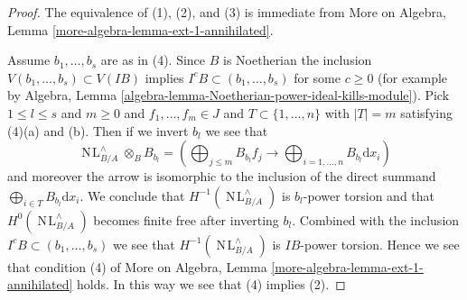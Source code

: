 \documentclass{stacks-project}
\theoremstyle{plain}
\theoremstyle{definition}
\theoremstyle{remark}
\numberwithin{equation}{subsection}
\def\NL{\mathop{N\!L}\nolimits}
\begin{document}
\begin{proof}
The equivalence of (1), (2), and (3) is immediate from
More on Algebra, Lemma \ref{more-algebra-lemma-ext-1-annihilated}.

\medskip\noindent
Assume $b_1, \ldots, b_s$ are as in (4). Since $B$ is Noetherian the inclusion
$V(b_1, \ldots, b_s) \subset V(IB)$ implies $I^cB \subset (b_1, \ldots, b_s)$
for some $c \geq 0$ (for example by
Algebra, Lemma \ref{algebra-lemma-Noetherian-power-ideal-kills-module}).
Pick $1 \leq l \leq s$ and $m \geq 0$ and $f_1, \ldots, f_m \in J$
and $T \subset \{1, \ldots, n\}$ with $|T| = m$ satisfying (4)(a) and (b).
Then if we invert $b_l$ we see that
$$
\NL_{B/A}^\wedge \otimes_B B_{b_l} =
\left(
\bigoplus\nolimits_{j \leq m} B_{b_l} f_j
\longrightarrow
\bigoplus\nolimits_{i = 1, \ldots, n} B_{b_l} \text{d}x_i
\right)
$$
and moreover the arrow is isomorphic to the inclusion of the direct
summand $\bigoplus_{i \in T} B_{b_l} \text{d}x_i$. We conclude that
$H^{-1}(\NL_{B/A}^\wedge)$ is $b_l$-power torsion and that
$H^0(\NL_{B/A}^\wedge)$ becomes finite free after inverting $b_l$.
Combined with the inclusion $I^cB \subset (b_1, \ldots, b_s)$
we see that $H^{-1}(\NL_{B/A}^\wedge)$ is $IB$-power torsion.
Hence we see that condition (4) of
More on Algebra, Lemma \ref{more-algebra-lemma-ext-1-annihilated}
holds. In this way we see that (4) implies (2).


\end{proof}
\end{document}
